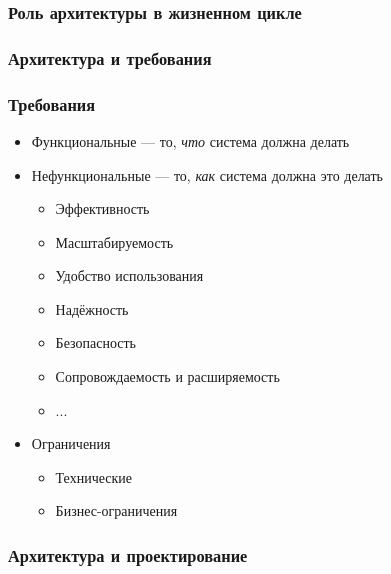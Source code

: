 \documentclass{../cscslides}
\begin{document}
    \begin{frame}
        \frametitle{Роль архитектуры в жизненном цикле}
    \end{frame}

    \begin{frame}
        \frametitle{Архитектура и требования}
    \end{frame}

    \begin{frame}
        \frametitle{Требования}
        \begin{itemize}
            \item Функциональные --- то, \emph{что} система должна делать
            \item Нефункциональные --- то, \emph{как} система должна это делать
            \begin{itemize}
                \item Эффективность
                \item Масштабируемость
                \item Удобство использования
                \item Надёжность
                \item Безопасность
                \item Сопровождаемость и расширяемость
                \item ...
            \end{itemize}
            \item Ограничения
            \begin{itemize}
                \item Технические
                \item Бизнес-ограничения
            \end{itemize}
        \end{itemize}
    \end{frame}

    \begin{frame}
        \frametitle{Архитектура и проектирование}
    \end{frame}
\end{document}

